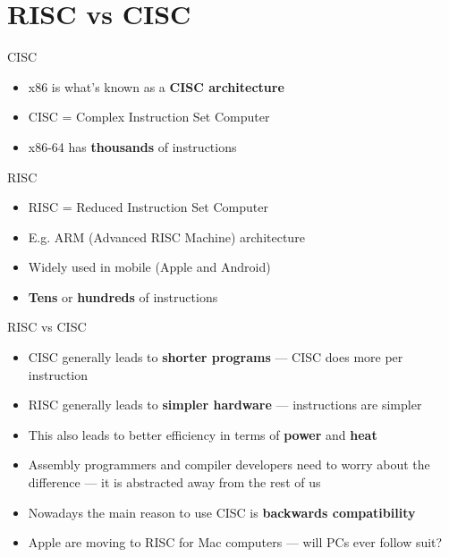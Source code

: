 \part{RISC vs CISC}
\frame{\partpage}

\begin{frame}{CISC}
    \begin{itemize}
        \pause\item x86 is what's known as a \textbf{CISC architecture}
        \pause\item CISC = Complex Instruction Set Computer
        \pause\item x86-64 has \textbf{thousands} of instructions %
    \end{itemize}
\end{frame}

\begin{frame}{RISC}
    \begin{itemize}
        \pause\item RISC = Reduced Instruction Set Computer
        \pause\item E.g. ARM (Advanced RISC Machine) architecture
        \pause\item Widely used in mobile (Apple and Android)
        \pause\item \textbf{Tens} or \textbf{hundreds} of instructions
    \end{itemize}
\end{frame}

\begin{frame}{RISC vs CISC}
    \begin{itemize}
        \pause\item CISC generally leads to \textbf{shorter programs} --- CISC does more per instruction
        \pause\item RISC generally leads to \textbf{simpler hardware} --- instructions are simpler
        \pause\item This also leads to better efficiency in terms of \textbf{power} and \textbf{heat}
        \pause\item Assembly programmers and compiler developers need to worry about the difference --- it is abstracted away from the rest of us
        \pause\item Nowadays the main reason to use CISC is \textbf{backwards compatibility}
        \pause\item Apple are moving to RISC for Mac computers --- will PCs ever follow suit?
    \end{itemize}
\end{frame}

